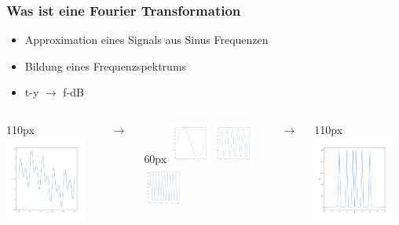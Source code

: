 
\begin{frame}
    \frametitle{Was ist eine Fourier Transformation}
    \begin{itemize}
        \item Approximation eines Signals aus Sinus Frequenzen 
        \item Bildung eines Frequenzspektrums
        \item t-y $\rightarrow$ f-dB
    \end{itemize}    

    \begin{columns}
        \begin{column}{110px}
            \includegraphics[width=100px]{images/01-what-is-fourier-signal.png}
        \end{column}
        \hspace*{-50px}
        $\rightarrow$
        \begin{column}{60px}
            \centering
            \includegraphics[width=50px]{images/01-what-is-fourier-signal-component-1.png}
            \includegraphics[width=50px]{images/01-what-is-fourier-signal-component-2.png}
            \includegraphics[width=50px]{images/01-what-is-fourier-signal-component-3.png}
        \end{column}
        \hspace*{-40px}
        $\rightarrow$
        \begin{column}{110px}
            \includegraphics[width=100px]{images/01-what-is-fourier-signal-transform.png}
        \end{column}
    \end{columns}

\end{frame}
